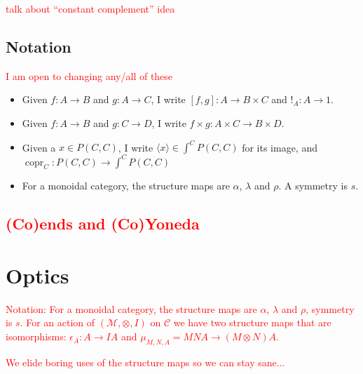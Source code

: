 \documentclass[11pt,a4paper]{article}
\theoremstyle{plain}
\theoremstyle{definition}
\newcommand{\C}{\mathscr{C}}
\newcommand{\M}{\mathscr{M}}
\DeclareMathOperator{\copr}{copr}
\newcommand{\todo}[1]{\textcolor{red}{\small #1}}
\begin{document}
\todo{talk about ``constant complement'' idea}

\subsection{Notation}
\todo{I am open to changing any/all of these}
\begin{itemize}
\item Given $f : A \to B$ and $g : A \to C$, I write $[f, g] : A \to B \times C$ and $!_A : A \to 1$.
\item Given $f : A \to B$ and $g : C \to D$, I write $f \times g : A \times C \to B \times D$.
\item Given a $x \in P(C, C)$, I write $\langle x \rangle \in \int^C P(C, C)$ for its image, and $\copr_C : P(C,C) \to \int^C P(C, C)$
\item For a monoidal category, the structure maps are $\alpha$, $\lambda$ and $\rho$. A symmetry is $s$.
\end{itemize}

\todo{
\subsection{(Co)ends and (Co)Yoneda}
}

\section{Optics}

\todo{ Notation: For a monoidal category, the structure maps are $\alpha$, $\lambda$ and $\rho$, symmetry is $s$. For an action of $(\M, \otimes, I)$ on $\C$ we have two structure maps that are isomorphisms: $\epsilon_A : A \to IA$ and $\mu_{M,N,A} = MNA \to (M \otimes N)A$. }

\todo{ We elide boring uses of the structure maps so we can stay sane...}
\end{document}
